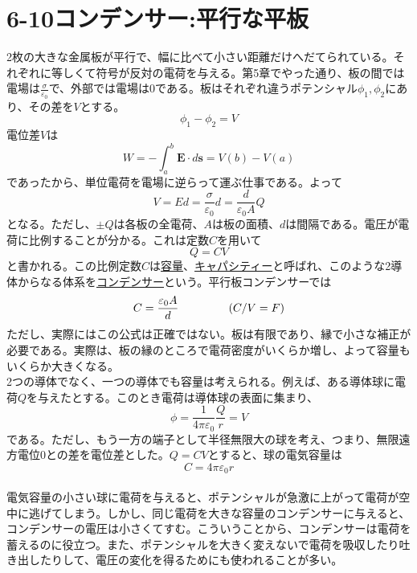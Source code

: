 \documentclass{jsarticle}
\begin{document}
\newpage
\section*{6-10\hspace{5mm}コンデンサー:平行な平板}
\noindent
2枚の大きな金属板が平行で、幅に比べて小さい距離だけへだてられている。それぞれに等しくて符号が反対の電荷を与える。第5章でやった通り、板の間では電場は\(\frac{\sigma}{\varepsilon_{0}}\)で、外部では電場は0である。板はそれぞれ違うポテンシャル\(\phi_{1},\phi_{2}\)にあり、その差を\(V\)とする。
\[\phi_{1}-\phi_{2}=V\]
電位差\(V\)は
\begin{equation}
W=-\int_{a}^{b}\bm{E}\cdot d\bm{s}=V(b)-V(a)
\end{equation}
であったから、単位電荷を電場に逆らって運ぶ仕事である。よって
\begin{equation}
V=Ed=\frac{\sigma}{\varepsilon_{0}}d=\frac{d}{\varepsilon_{0}A}Q
\end{equation}
となる。ただし、\(\pm Q\)は各板の全電荷、\(A\)は板の面積、\(d\)は間隔である。電圧が電荷に比例することが分かる。これは定数\(C\)を用いて
\begin{equation}
Q=CV
\end{equation}
と書かれる。この比例定数\(C\)は\underline{容量}、\underline{キャパシティー}と呼ばれ、このような2導体からなる体系を\underline{コンデンサー}という。平行板コンデンサーでは
\begin{equation}
C=\frac{\varepsilon_{0}A}{d}\hspace{15mm}\left(C/V=F\right)
\end{equation}
ただし、実際にはこの公式は正確ではない。板は有限であり、縁で小さな補正が必要である。実際は、板の縁のところで電荷密度がいくらか増し、よって容量もいくらか大きくなる。\\
2つの導体でなく、一つの導体でも容量は考えられる。例えば、ある導体球に電荷\(Q\)を与えたとする。このとき電荷は導体球の表面に集まり、
\begin{equation}
\phi=\frac{1}{4\pi\varepsilon_{0}}\frac{Q}{r}=V
\end{equation}
である。ただし、もう一方の端子として半径無限大の球を考え、つまり、無限遠方電位0との差を電位差とした。\(Q=CV\)とすると、球の電気容量は
\begin{equation}
C=4\pi\varepsilon_{0}r
\end{equation}
\\
電気容量の小さい球に電荷を与えると、ポテンシャルが急激に上がって電荷が空中に逃げてしまう。しかし、同じ電荷を大きな容量のコンデンサーに与えると、コンデンサーの電圧は小さくてすむ。こういうことから、コンデンサーは電荷を蓄えるのに役立つ。また、ポテンシャルを大きく変えないで電荷を吸収したり吐き出したりして、電圧の変化を得るためにも使われることが多い。\\
\\
\end{document}
